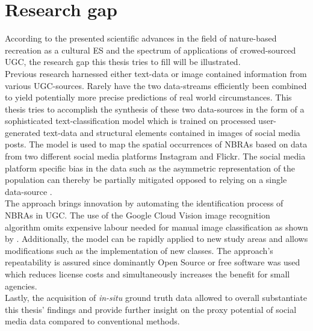 \section{Research gap}
According to the presented scientific advances in the field of nature-based recreation as a cultural ES and the spectrum of applications of crowed-sourced UGC, the research gap this thesis tries to fill will be illustrated. \\
Previous research harnessed either text-data \parencite{Barchiesi2015, Monkman2018, Wartmann2018} or image contained information \parencite{Richards2018, Heikinheimo2017} from various UGC-sources. Rarely have the two data-streams efficiently been combined to yield potentially more precise predictions of real world circumstances. This thesis tries to accomplish the synthesis of these two data-sources in the form of a sophisticated text-classification model which is trained on processed user-generated text-data and structural elements contained in images of social media posts. The model is used to map the spatial occurrences of NBRAs based on data from two different social media platforms Instagram and Flickr. The social media platform specific bias in the data such as the asymmetric representation of the population can thereby be partially mitigated opposed to relying on a single data-source \parencite{Barchiesi2015, Grossenbacher2014, Monkman2018, Mancini2018}. \\
The approach brings innovation by automating the identification process of NBRAs in UGC. The use of the Google Cloud Vision image recognition algorithm omits expensive labour needed for manual image classification as shown by \textcite{Richards2018}. Additionally, the model can be rapidly applied to new study areas and allows modifications such as the implementation of new classes. The approach's repeatability is assured since dominantly Open Source or free software was used which reduces license costs and simultaneously increases the benefit for small agencies. \\
Lastly, the acquisition of \textit{in-situ} ground truth data allowed to overall substantiate this thesis' findings and provide further insight on the proxy potential of social media data compared to conventional methods. 

 
